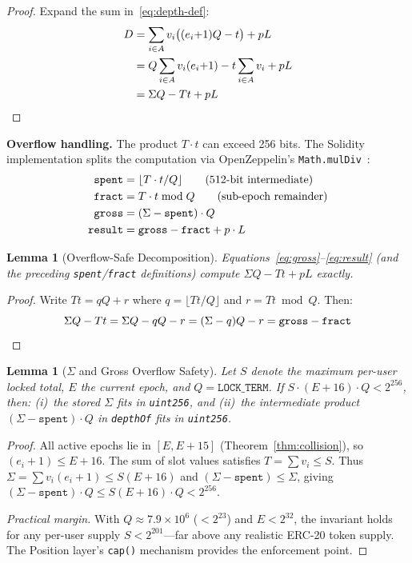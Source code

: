 \documentclass[10pt,a4paper,twocolumn]{article}
\theoremstyle{definition}
\theoremstyle{plain}
\newtheorem{lemma}[theorem]{Lemma}
\theoremstyle{remark}
\begin{document}
\begin{proof}
Expand the sum in~\eqref{eq:depth-def}:
\begin{align*}
D &= \sum_{i \in A} v_i \bigl((e_i{+}1)Q - t\bigr) + p L \\
  &= Q \sum_{i \in A} v_i(e_i{+}1) - t \sum_{i \in A} v_i + p L \\
  &= \Sigma Q - T t + p L \qedhere
\end{align*}
\end{proof}

\textbf{Overflow handling.} The product $T \cdot t$ can exceed 256 bits. The Solidity implementation splits the computation via OpenZeppelin's \texttt{Math.mulDiv}~\cite{oz-math}:
\begin{align}
\texttt{spent}  &= \lfloor T \cdot t / Q \rfloor \tag{\text{512-bit intermediate}} \\
\texttt{fract}  &= T \cdot t \bmod Q \tag{\text{sub-epoch remainder}} \\
\texttt{gross}  &= (\Sigma - \texttt{spent}) \cdot Q \label{eq:gross} \\
\texttt{result} &= \texttt{gross} - \texttt{fract} + p \cdot L \label{eq:result}
\end{align}

\begin{lemma}[Overflow-Safe Decomposition]
\label{lem:overflow}
Equations~\eqref{eq:gross}--\eqref{eq:result} (and the preceding \texttt{spent}/\texttt{fract} definitions) compute $\Sigma Q - T t + pL$ exactly.
\end{lemma}

\begin{proof}
Write $Tt = qQ + r$ where $q = \lfloor Tt/Q \rfloor$ and $r = Tt \bmod Q$. Then:
\[
\Sigma Q - Tt = \Sigma Q - qQ - r = (\Sigma - q)Q - r = \texttt{gross} - \texttt{fract} \qedhere
\]
\end{proof}

\begin{lemma}[$\Sigma$ and Gross Overflow Safety]
\label{lem:sigma-overflow}
Let $S$ denote the maximum per-user locked total, $E$ the current epoch, and $Q = \texttt{LOCK\_TERM}$. If $S \cdot (E{+}16) \cdot Q < 2^{256}$, then: (i)~the stored $\Sigma$ fits in \texttt{uint256}, and (ii)~the intermediate product $(\Sigma - \texttt{spent}) \cdot Q$ in \texttt{depthOf} fits in \texttt{uint256}.
\end{lemma}

\begin{proof}
All active epochs lie in $[E, E{+}15]$ (Theorem~\ref{thm:collision}), so $(e_i{+}1) \leq E{+}16$. The sum of slot values satisfies $T = \sum v_i \leq S$. Thus $\Sigma = \sum v_i(e_i{+}1) \leq S(E{+}16)$ and $(\Sigma - \texttt{spent}) \leq \Sigma$, giving $(\Sigma - \texttt{spent}) \cdot Q \leq S(E{+}16) \cdot Q < 2^{256}$.

\emph{Practical margin.} With $Q \approx 7.9 \times 10^6$ ($< 2^{23}$) and $E < 2^{32}$, the invariant holds for any per-user supply $S < 2^{201}$---far above any realistic ERC-20 token supply. The Position layer's \texttt{cap()} mechanism provides the enforcement point.
\end{proof}
\end{document}
